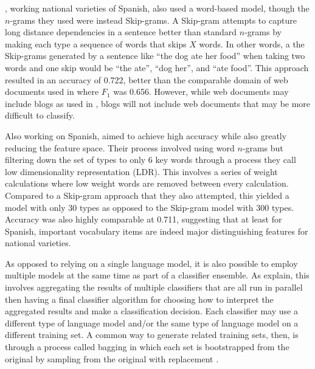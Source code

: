 \documentclass{article}
\begin{document}
      \textcite{franco-salvador_language_2015}, working national varieties of Spanish, also used a word-based model, though the $n$-grams they used were instead Skip-grams.
      A Skip-gram attempts to capture long distance dependencies in a sentence better than standard $n$-grams by making each type a sequence of words that skips $X$ words.
      In other words, a the Skip-grams generated by a sentence like ``the dog ate her food'' when taking two words and one skip would be ``the ate'', ``dog her'', and ``ate food''.
      This approach resulted in an accuracy of 0.722, better than the comparable domain of web documents used in \textcite{lui_classifying_2013} where $F_1$ was 0.656.
      However, while web documents may include blogs as used in \textcite{franco-salvador_language_2015}, blogs will not include web documents that may be more difficult to classify.

      Also working on Spanish, \textcite{rangel_low_2018} aimed to achieve high accuracy while also greatly reducing the feature space.
      Their process involved using word $n$-grams but filtering down the set of types to only 6 key words through a process they call low dimensionality representation (LDR).
      This involves a series of weight calculations where low weight words are removed between every calculation.
      Compared to a Skip-gram approach that they also attempted, this yielded a model with only 30 types as opposed to the Skip-gram model with 300 types.
      Accuracy was also highly comparable at 0.711, suggesting that at least for Spanish, important vocabulary items are indeed major distinguishing features for national varieties.


      As opposed to relying on a single language model, it is also possible to employ multiple models at the same time as part of a classifier ensemble.
      As \textcite{malmasi_language_2015} explain, this involves aggregating the results of multiple classifiers that are all run in parallel then having a final classifier algorithm for choosing how to interpret the aggregated results and make a classification decision.
      Each classifier may use a different type of language model and/or the same type of language model on a different training set.
      A common way to generate related training sets, then, is through a process called bagging in which each set is bootstrapped from the original by sampling from the original with replacement \parencite{breiman_bagging_1996}.
\end{document}

